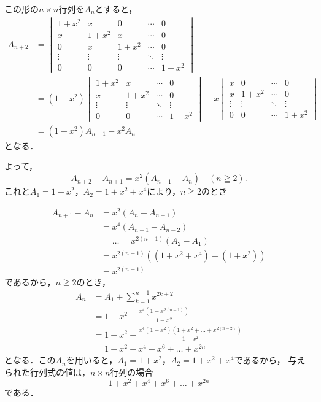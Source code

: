 \begin{tanswer}
  この形の$n\times n $行列を$A_n$とすると，
  \begin{align*}
    A_{n+2} & =
    \begin{vmatrix}
      1+x^2  & x      & 0      & \cdots & 0      \\
      x      & 1+x^2  & x      & \cdots & 0      \\
      0      & x      & 1+x^2  & \cdots & 0      \\
      \vdots & \vdots & \vdots & \ddots & \vdots \\
      0      & 0      & 0      & \cdots & 1+x^2
    \end{vmatrix} \\
            & = (1+x^2)
    \begin{vmatrix}
      1+x^2  & x      & \cdots & 0      \\
      x      & 1+x^2  & \cdots & 0      \\
      \vdots & \vdots & \ddots & \vdots \\
      0      & 0      & \cdots & 1+x^2
    \end{vmatrix}
    -x \begin{vmatrix}
         x      & 0      & \cdots & 0      \\
         x      & 1+x^2  & \cdots & 0      \\
         \vdots & \vdots & \ddots & \vdots \\
         0      & 0      & \cdots & 1+x^2
       \end{vmatrix}
    \\
            & = (1+x^2) A_{n+1} -x^2 A_n
  \end{align*}
  となる．

  よって，
  \[
    A_{n+2}-A_{n+1}=x^2 (A_{n+1}-A_n)\quad ( n \geqq 2) .
  \]
  これと$ A_1=1+x^2$，$ A_2 = 1+x^2 + x^4$により，$n \geqq 2$のとき

  \begin{align*}
    A_{n+1}-A_{n} & = x^2 (A_n-A_{n-1})                   \\
                  & = x^4 (A_{n-1} - A_{n-2})             \\
                  & = \dots = x^{2(n-1)}(A_2-A_1)         \\
                  & = x^{2(n-1)} ((1+x^2 + x^4) -(1+x^2)) \\
                  & = x^{2(n+1)}
  \end{align*}
  であるから，$n \geqq 2$のとき，
  \begin{align*}
    A_n & = A_1 +\sum_{k=1}^{n-1} x^{2k+2}                                \\
        & = 1+x^2 + \frac{x^4(1-x^{2(n-1)})}{1-x^2}                       \\
        & = 1+x^2 + \frac{x^4 (1-x^2)(1+x^2 + \dots + x^{2(n-2)})}{1-x^2} \\
        & = 1+x^2 + x^4 + x^6 + \dots + x^{2n}
  \end{align*}
  となる．この$ A_n$を用いると，$ A_1 = 1+x^2 $，$ A_2 = 1+x^2+x^4$であるから，
  与えられた行列式の値は，$n \times n$行列の場合
  \[
    1+x^2 + x^4 + x^6 + \dots + x^{2n}
  \]
  である．
\end{tanswer}
